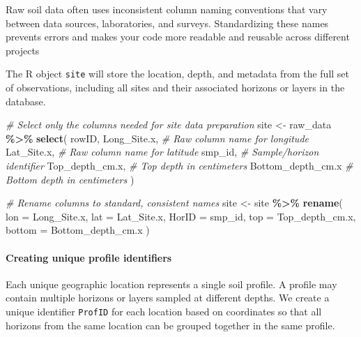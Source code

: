 \documentclass[
  10pt,
  b5paper,
  oneside]{book}
\newenvironment{Shaded}{\begin{snugshade}}{\end{snugshade}}
\newcommand{\AttributeTok}[1]{\textcolor[rgb]{0.13,0.29,0.53}{#1}}
\newcommand{\CommentTok}[1]{\textcolor[rgb]{0.56,0.35,0.01}{\textit{#1}}}
\newcommand{\FunctionTok}[1]{\textcolor[rgb]{0.13,0.29,0.53}{\textbf{#1}}}
\newcommand{\NormalTok}[1]{#1}
\newcommand{\OtherTok}[1]{\textcolor[rgb]{0.56,0.35,0.01}{#1}}
\newcommand{\SpecialCharTok}[1]{\textcolor[rgb]{0.81,0.36,0.00}{\textbf{#1}}}
\begin{document}
Raw soil data often uses inconsistent column naming conventions that vary between data sources, laboratories, and surveys. Standardizing these names prevents errors and makes your code more readable and reusable across different projects

The R object \texttt{site} will store the location, depth, and metadata from the full set of observations, including all sites and their associated horizons or layers in the database.

\begin{Shaded}
\begin{Highlighting}[]
\CommentTok{\# Select only the columns needed for site data preparation}
\NormalTok{site }\OtherTok{\textless{}{-}}\NormalTok{ raw\_data }\SpecialCharTok{\%\textgreater{}\%}
  \FunctionTok{select}\NormalTok{(}
\NormalTok{    rowID,}
\NormalTok{    Long\_Site.x,              }\CommentTok{\# Raw column name for longitude}
\NormalTok{    Lat\_Site.x,               }\CommentTok{\# Raw column name for latitude}
\NormalTok{    smp\_id,                   }\CommentTok{\# Sample/horizon identifier}
\NormalTok{    Top\_depth\_cm.x,           }\CommentTok{\# Top depth in centimeters}
\NormalTok{    Bottom\_depth\_cm.x         }\CommentTok{\# Bottom depth in centimeters}
\NormalTok{  )}

  \CommentTok{\# Rename columns to standard, consistent names}
\NormalTok{site }\OtherTok{\textless{}{-}}\NormalTok{ site }\SpecialCharTok{\%\textgreater{}\%}
  \FunctionTok{rename}\NormalTok{(}
    \AttributeTok{lon =}\NormalTok{ Long\_Site.x,}
    \AttributeTok{lat =}\NormalTok{ Lat\_Site.x,}
    \AttributeTok{HorID =}\NormalTok{ smp\_id,}
    \AttributeTok{top =}\NormalTok{ Top\_depth\_cm.x,}
    \AttributeTok{bottom =}\NormalTok{ Bottom\_depth\_cm.x}
\NormalTok{  ) }
\end{Highlighting}
\end{Shaded}

\paragraph*{Creating unique profile identifiers}\label{creating-unique-profile-identifiers}

Each unique geographic location represents a single soil profile. A profile may contain multiple horizons or layers sampled at different depths. We create a unique identifier \texttt{ProfID} for each location based on coordinates so that all horizons from the same location can be grouped together in the same profile.
\end{document}
